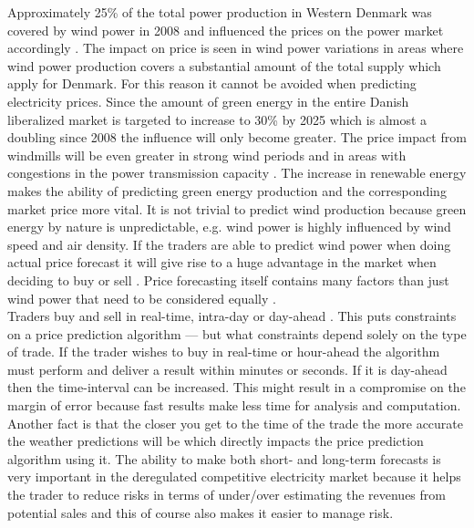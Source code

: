 Approximately 25\% of the total power production in Western Denmark was covered by wind power in 2008 and influenced the prices on the power market accordingly \cite{windPowerDanishLiberalized}. The impact on price is seen in wind power variations in areas where wind power production covers a substantial amount of the total supply which apply for Denmark. For this reason it cannot be avoided when predicting electricity prices\cite{dayAheadImpactOfWindPowerForecasts}. Since the amount of green energy in the entire Danish liberalized market is targeted to increase to 30\% by 2025 which is almost a doubling since 2008 \cite{windPowerDanishLiberalized} the influence will only become greater. The price impact from windmills will be even greater in strong wind periods and in areas with congestions in the power transmission capacity \cite{windPowerDanishLiberalized}. The increase in renewable energy makes the ability of predicting green energy production and the corresponding market price more vital. It is not trivial to predict wind production because green energy by nature is unpredictable, e.g. wind power is highly influenced by wind speed and air density. If the traders are able to predict wind power when doing actual price forecast it will give rise to a huge advantage in the market when deciding to buy or sell \cite{dayAheadImpactOfWindPowerForecasts}. Price forecasting itself contains many factors than just wind power that need to be considered equally \cite{21}.
\\[0.5cm] Traders buy and sell in real-time, intra-day or day-ahead
\cite{FIND REF}. This puts constraints on a price prediction algorithm --- but what constraints depend solely on the type of trade. If the trader wishes to buy in real-time or hour-ahead the algorithm must perform and deliver a result within minutes or seconds. If it is day-ahead then the time-interval can be increased. This might result in a compromise on the margin of error because fast results make less time for analysis and computation. Another fact is that the closer you get to the time of the trade the more accurate the weather predictions will be which directly impacts the price prediction algorithm using it. The ability to make both short- and long-term forecasts is very important in the deregulated competitive electricity market because it helps the trader to reduce risks in terms of under/over estimating the revenues from potential sales and this of course also makes it easier to manage risk\cite{21}.
\\[0.5cm]
